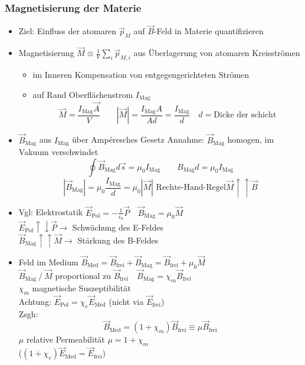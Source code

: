 \documentclass[titlepage,12pt,a4paper,ngerman]{report}
\newcommand{\tx}[1]{\textrm{#1}}
\begin{document}
\subsubsection{Magnetisierung der Materie}
\begin{itemize}
	\item Ziel: Einfluss der atomaren $ \vec{p}_M $ auf $ \vec{B} $-Feld in Materie quantifizieren
	\item Magnetisierung $ \vec{M} \equiv \frac{1}{V} \sum_i \vec{p}_{M,i} $ aus Überlagerung von atomaren Kreisströmen
	\begin{itemize}
		\item im Inneren Kompensation von entgegengerichteten Strömen
		\item auf Rand Oberflächenstrom $ I_{\tx{Mag}} $
		$$ \vec{M} = \frac{I_{\tx{Mag}} \vec{A}}{V} \qquad | \vec{M} | = \frac{I_{\tx{Mag}} A}{A d}  = \frac{I_{\tx{Mag}}}{d} \quad  d = \tx{Dicke der schicht}$$
	\end{itemize}
	\item  $ \vec{B}_{\tx{Mag}} $ aus $ I_{\tx{Mag}} $ über Ampéresches Gesetz Annahme: $ \vec{B}_{\tx{Mag}} $ homogen, im Vakuum verschwindet
	$$ \oint \vec{B}_{\tx{Mag}} d\vec{s} = \mu_0 I_{\tx{Mag}} \qquad B_{\tx{Mag}} d = \mu_0 I_{\tx{Mag}} $$
	$$|\vec{B}_{\tx{Mag}}| = \mu_0 \frac{I_{\tx{Mag}}}{d} = \mu_0 | \vec{M} | \tx{ Rechte-Hand-Regel} \vec{M} \uparrow \uparrow \vec{B}$$
	\item  Vgl: Elektrostatik $ \vec{E}_{\tx{Pol}}  = - \frac{1}{\epsilon_0}  \vec{P} \quad \vec{B}_{\tx{Mag}} = \mu_0 \vec{M} $\\
		$\vec{E}_{\tx{Pol}} \uparrow \downarrow \vec{P} \rightarrow $ Schwächung des E-Feldes\\
		$ \vec{B}_{\tx{Mag}} \uparrow \uparrow \vec{M} \rightarrow $ Stärkung des B-Feldes
	\item Feld im Medium $ \vec{B}_{\tx{Med}} = \vec{B}_{\tx{frei}} + \vec{B}_{\tx{Mag}} = \vec{B}_{\tx{frei}} + \mu_0 \vec{M} $\\
	$  \vec{B}_{\tx{Mag}}\ /\  \vec{M} $ proportional zu $ \vec{B}_{\tx{frei}}  \quad \vec{B}_{\tx{Mag}} = \chi_m \vec{B}_{\tx{frei}} $\\
	$ \chi_m $ magnetische Suszeptibilität \\
	Achtung: $ \vec{E}_{\tx{Pol}} =\chi_e \vec{E}_{\tx{Med}} $ (nicht via $ \vec{E}_{\tx{frei}} $)\\
	Zsgh: $$ \vec{B}_{\tx{Med}} = (1 + \chi_m) \vec{B}_{\tx{frei}}\equiv \mu \vec{B}_{\tx{frei}} $$
	$ \mu $ relative Permeabilität $ \mu = 1 + \chi_m $\\
	($(1+\chi_e) \vec{E}_{\tx{Med}} = \vec{E}_{\tx{frei}}$)
\end{itemize}
\end{document}
